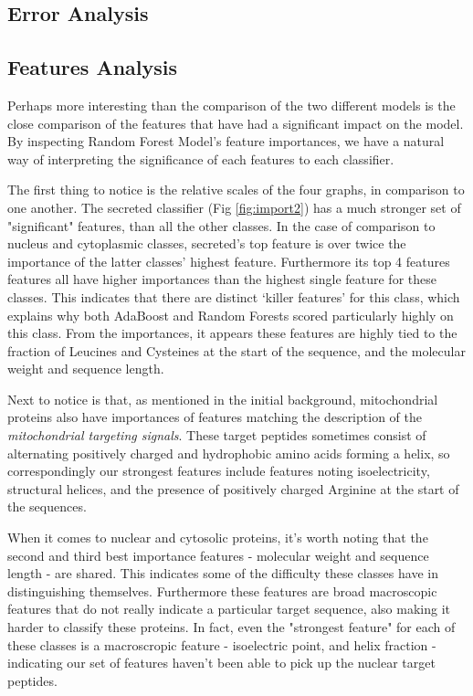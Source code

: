 \documentclass{bioinfo}
\begin{document}
\subsection{Error Analysis}

\subsection{Features Analysis}

Perhaps more interesting than the comparison of the two different models is the close comparison of the features that have had a significant impact on the model.
By inspecting Random Forest Model's feature importances, we have a natural way of interpreting the significance of each features to each classifier.

The first thing to notice is the relative scales of the four graphs, in comparison to one another. The secreted classifier (Fig \ref{fig:import2}) has a much stronger set of "significant" features, than all the other classes. 
In the case of comparison to nucleus and cytoplasmic classes, secreted's top feature is over twice the importance of the latter classes' highest feature. 
Furthermore its top 4 features features all have higher importances than the highest single feature for these classes.  
This indicates that there are distinct `killer features' for this class, which explains why both AdaBoost and Random Forests scored particularly highly on this class.
From the importances, it appears these features are highly tied to the fraction of Leucines and Cysteines at the start of the sequence, and the molecular weight and sequence length.

Next to notice is that, as mentioned in the initial background, mitochondrial proteins also have importances of features matching the description of the \textit{mitochondrial targeting signals}. 
These target peptides sometimes consist of alternating positively charged and hydrophobic amino acids forming a helix, so correspondingly our strongest features include features noting isoelectricity, structural helices, and the presence of positively charged Arginine at the start of the sequences.

When it comes to nuclear and cytosolic proteins, it's worth noting that the second and third best importance features - molecular weight and sequence length - are shared. 
This indicates some of the difficulty these classes have in distinguishing themselves.  
Furthermore these features are broad macroscopic features that do not really indicate a particular target sequence, also making it harder to classify these proteins. 
In fact, even the "strongest feature" for each of these classes is a macroscropic feature - isoelectric point, and helix fraction - indicating our set of features haven't been able to pick up the nuclear target peptides.
\end{document}
